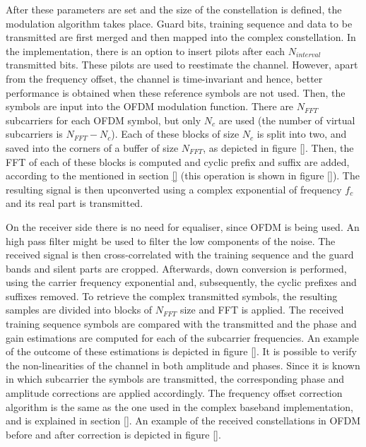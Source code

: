 \documentclass[12pt,a4paper,openright]{report}
\begin{document}
After these parameters are set and the size of the constellation is defined, the modulation algorithm takes place. Guard bits, training sequence and data to be transmitted are first merged and then mapped into the complex constellation. In the implementation, there is an option to insert pilots after each $N_{interval}$ transmitted bits. These pilots are used to reestimate the channel. However, apart from the frequency offset, the channel is time-invariant and hence, better performance is obtained when these reference symbols are not used. Then, the symbols are input into the OFDM modulation function. There are $N_{FFT}$ subcarriers for each OFDM symbol, but only $N_c$ are used (the number of virtual subcarriers is $N_{FFT}-N_c$). Each of these blocks of size $N_c$ is split into two, and saved into the corners of a buffer of size $N_{FFT}$, as depicted in figure \ref{}. Then, the FFT of each of these blocks is computed and cyclic prefix and suffix are added, according to the mentioned in section \ref{} (this operation is shown in figure \ref{}). The resulting signal is then upconverted using a complex exponential of frequency  $f_c$ and its real part is transmitted.   

On the receiver side there is no need for equaliser, since OFDM is being used. An high pass filter might be used to filter the low components of the noise. The received signal is then cross-correlated with the training sequence and the guard bands and silent parts are cropped. Afterwards, down conversion is performed, using the carrier frequency exponential and, subsequently, the cyclic prefixes and suffixes removed. To retrieve the complex transmitted symbols, the resulting samples are divided into blocks of $N_{FFT}$ size and FFT is applied. The received training sequence symbols are compared with the transmitted and the phase and gain estimations are computed for each of the subcarrier frequencies. An example of the outcome of these estimations is depicted in figure \ref{}. It is possible to verify the non-linearities of the channel in both amplitude and phases. Since it is known in which subcarrier the symbols are transmitted, the corresponding phase and amplitude corrections are applied accordingly. The frequency offset correction algorithm is the same as the one used in the complex baseband implementation, and is explained in section \ref{}. An example of the received constellations in OFDM before and after correction is depicted in figure \ref{}.
\end{document}
